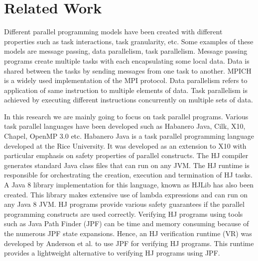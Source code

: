 \section{Related Work}

Different parallel programming models have been created with different properties such as task interactions, task granularity,  etc. Some examples of these models are message passing, data parallelism, task parallelism. Message passing \cite{Forum:1994:MMI:898758} programs create multiple tasks with each encapsulating some local data. Data is shared between the tasks by sending messages from one task to another. MPICH is a widely used implementation of the MPI protocol. Data parallelism refers to application of same instruction to multiple elements of data. Task parallelism is achieved by executing different instructions concurrently on multiple sets of data.

In this research we are mainly going to focus on task parallel programs. Various task parallel languages have been developed such as Habanero Java, Cilk, X10, Chapel, OpenMP 3.0 etc. Habanero Java \cite{cave2011habanero} is a task parallel programming language developed at the Rice University. It was developed as an extension to X10 with particular emphasis on safety properties of parallel constructs. The HJ compiler generates standard Java class files that can run on any JVM. The HJ runtime is responsible for orchestrating the creation, execution and termination of HJ tasks. A Java 8 library implementation for this language, known as HJLib \cite{imam2014habanero} has also been created. This library makes extensive use of lambda expressions and can run on any Java 8 JVM. HJ programs provide various safety guarantees if the parallel programming constructs are used correctly. Verifying HJ programs using tools such as Java Path Finder (JPF) can be time and memory consuming because of the numerous JPF state expansions. Hence, an HJ verification runtime (VR) \cite{anderson2014jpf} was developed by Anderson et al. to use JPF for verifying HJ programs. This runtime provides a lightweight alternative to verifying HJ programs using JPF.

